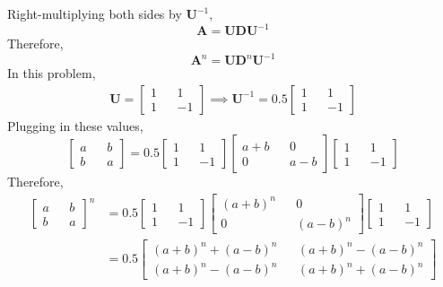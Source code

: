 \documentclass[11pt, oneside]{article}   	%
\begin{document}
Right-multiplying both sides by $\boldsymbol{U}^{-1}$,
\begin{equation}
\boldsymbol{A} = \boldsymbol{U} \boldsymbol{D} \boldsymbol{U}^{-1}
\end{equation}
Therefore,
\begin{equation}
\boldsymbol{A}^n = \boldsymbol{U} \boldsymbol{D}^n \boldsymbol{U}^{-1}
\end{equation}
In this problem,
\begin{align}
\boldsymbol{U} = \begin{bmatrix}
1 && 1 \\
1 && -1
\end{bmatrix} \implies
\boldsymbol{U}^{-1} = 0.5\begin{bmatrix}
1 && 1 \\
1 && -1
\end{bmatrix}
\end{align}
Plugging in these values,
\begin{equation}
\begin{bmatrix}
a && b \\
b && a
\end{bmatrix} = 0.5 \begin{bmatrix}
1 && 1 \\
1 && -1
\end{bmatrix} \begin{bmatrix}
a+b && 0 \\
0 && a-b
\end{bmatrix} \begin{bmatrix}
1 && 1 \\
1 && -1
\end{bmatrix}
\end{equation}
Therefore,
\begin{align}
\begin{bmatrix}
a && b \\
b && a
\end{bmatrix}^n &= 0.5 \begin{bmatrix}
1 && 1 \\
1 && -1
\end{bmatrix} \begin{bmatrix}
(a+b)^n && 0 \\
0 && (a-b)^n
\end{bmatrix} \begin{bmatrix}
1 && 1 \\
1 && -1
\end{bmatrix} \\
&= 0.5\begin{bmatrix}
(a+b)^n + (a-b)^n && (a+b)^n - (a-b)^n \\
(a+b)^n - (a-b)^n && (a+b)^n + (a-b)^n
\end{bmatrix}
\end{align}
\end{document}
